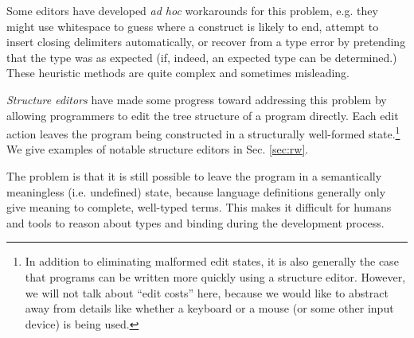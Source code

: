 Some editors have developed \emph{ad hoc} workarounds for this problem, e.g. they might use whitespace to guess where a construct is likely to end, attempt to insert closing delimiters automatically, or recover from a type error by pretending that the type was as expected (if, indeed, an expected type can be determined.) These heuristic methods are quite complex and sometimes misleading.



\emph{Structure editors} have made some progress toward addressing this
problem by allowing programmers to edit the tree structure of a program
directly. Each edit action leaves the program being constructed in a
structurally well-formed state.\footnote{In addition to eliminating malformed edit states, it is also generally the case that programs can be written more quickly using a structure editor. However, we will not talk about ``edit costs'' here, because we would like to abstract away from details like whether a keyboard or a mouse (or some other input device) is being used.} We give examples of notable structure editors in Sec. \ref{sec:rw}.  

The problem is that it is still possible to leave the program in a semantically meaningless (i.e. undefined) state, because language definitions generally only give meaning to complete, well-typed terms. This makes it difficult for humans and tools to reason about types and binding during the development process.  %


